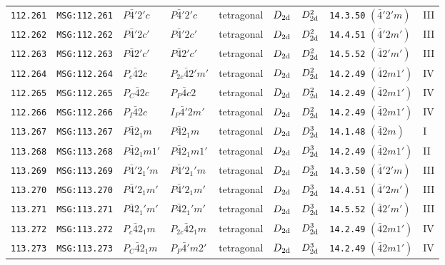 \documentclass[fleqn,10pt]{jsarticle}
\begin{document}
\begin{center}
\begin{longtable}{lllllllll}
\texttt{112.261} & \texttt{MSG:112.261} & $P\bar{4}'2'c$ & $P\bar{4}'2'c$ & tetragonal & $D_{\rm 2d}$ & $D_{\rm 2d}^{2}$ & \texttt{14.3.50} $(\bar{4}'2'm)$ & III \\
\texttt{112.262} & \texttt{MSG:112.262} & $P\bar{4}'2c'$ & $P\bar{4}'2c'$ & tetragonal & $D_{\rm 2d}$ & $D_{\rm 2d}^{2}$ & \texttt{14.4.51} $(\bar{4}'2m')$ & III \\
\texttt{112.263} & \texttt{MSG:112.263} & $P\bar{4}2'c'$ & $P\bar{4}2'c'$ & tetragonal & $D_{\rm 2d}$ & $D_{\rm 2d}^{2}$ & \texttt{14.5.52} $(\bar{4}2'm')$ & III \\
\texttt{112.264} & \texttt{MSG:112.264} & $P_{c}\bar{4}2c$ & $P_{2c}\bar{4}2'm'$ & tetragonal & $D_{\rm 2d}$ & $D_{\rm 2d}^{2}$ & \texttt{14.2.49} $(\bar{4}2m1')$ & IV \\
\texttt{112.265} & \texttt{MSG:112.265} & $P_{C}\bar{4}2c$ & $P_{P}\bar{4}c2$ & tetragonal & $D_{\rm 2d}$ & $D_{\rm 2d}^{2}$ & \texttt{14.2.49} $(\bar{4}2m1')$ & IV \\
\texttt{112.266} & \texttt{MSG:112.266} & $P_{I}\bar{4}2c$ & $I_{P}\bar{4}'2m'$ & tetragonal & $D_{\rm 2d}$ & $D_{\rm 2d}^{2}$ & \texttt{14.2.49} $(\bar{4}2m1')$ & IV \\ \hline
\texttt{113.267} & \texttt{MSG:113.267} & $P\bar{4}2_{1}m$ & $P\bar{4}2_{1}m$ & tetragonal & $D_{\rm 2d}$ & $D_{\rm 2d}^{3}$ & \texttt{14.1.48} $(\bar{4}2m)$ & I \\
\texttt{113.268} & \texttt{MSG:113.268} & $P\bar{4}2_{1}m1'$ & $P\bar{4}2_{1}m1'$ & tetragonal & $D_{\rm 2d}$ & $D_{\rm 2d}^{3}$ & \texttt{14.2.49} $(\bar{4}2m1')$ & II \\
\texttt{113.269} & \texttt{MSG:113.269} & $P\bar{4}'2_{1}'m$ & $P\bar{4}'2_{1}'m$ & tetragonal & $D_{\rm 2d}$ & $D_{\rm 2d}^{3}$ & \texttt{14.3.50} $(\bar{4}'2'm)$ & III \\
\texttt{113.270} & \texttt{MSG:113.270} & $P\bar{4}'2_{1}m'$ & $P\bar{4}'2_{1}m'$ & tetragonal & $D_{\rm 2d}$ & $D_{\rm 2d}^{3}$ & \texttt{14.4.51} $(\bar{4}'2m')$ & III \\
\texttt{113.271} & \texttt{MSG:113.271} & $P\bar{4}2_{1}'m'$ & $P\bar{4}2_{1}'m'$ & tetragonal & $D_{\rm 2d}$ & $D_{\rm 2d}^{3}$ & \texttt{14.5.52} $(\bar{4}2'm')$ & III \\
\texttt{113.272} & \texttt{MSG:113.272} & $P_{c}\bar{4}2_{1}m$ & $P_{2c}\bar{4}2_{1}m$ & tetragonal & $D_{\rm 2d}$ & $D_{\rm 2d}^{3}$ & \texttt{14.2.49} $(\bar{4}2m1')$ & IV \\
\texttt{113.273} & \texttt{MSG:113.273} & $P_{C}\bar{4}2_{1}m$ & $P_{P}\bar{4}'m2'$ & tetragonal & $D_{\rm 2d}$ & $D_{\rm 2d}^{3}$ & \texttt{14.2.49} $(\bar{4}2m1')$ & IV \\

\end{longtable}
\end{center}
\end{document}
